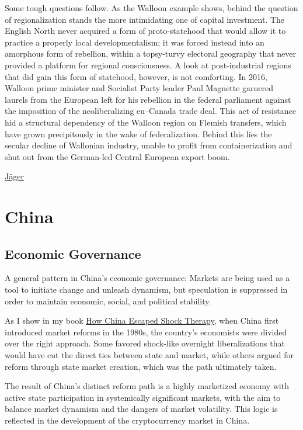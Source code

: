 \documentclass[
]{book}
\begin{document}
Some tough questions follow. As the Walloon example shows, behind the question of regionalization stands the more intimidating one of capital investment. The English North never acquired a form of proto-statehood that would allow it to practice a properly local developmentalism; it was forced instead into an amorphous form of rebellion, within a topsy-turvy electoral geography that never provided a platform for regional consciousness. A look at post-industrial regions that did gain this form of statehood, however, is not comforting. In 2016, Walloon prime minister and Socialist Party leader Paul Magnette garnered laurels from the European left for his rebellion in the federal parliament against the imposition of the neoliberalizing eu--Canada trade deal. This act of resistance hid a structural dependency of the Walloon region on Flemish transfers, which have grown precipitously in the wake of federalization. Behind this lies the secular decline of Wallonian industry, unable to profit from containerization and shut out from the German-led Central European export boom.

\href{https://newleftreview.org/issues/ii128/articles/anton-jager-rebel-regions}{Jäger}

\hypertarget{china}{%
\chapter{China}\label{china}}

\hypertarget{economic-governance}{%
\section{Economic Governance}\label{economic-governance}}

A general pattern in China's economic governance: Markets are being used as a tool to initiate change and unleash dynamism, but speculation is suppressed in order to maintain economic, social, and political stability.

As I show in my book \href{https://www.isabellaweber.com/book}{How China Escaped Shock Therapy}, when China first introduced market reforms in the 1980s, the country's economists were divided over the right approach. Some favored shock-like overnight liberalizations that would have cut the direct ties between state and market, while others argued for reform through state market creation, which was the path ultimately taken.

The result of China's distinct reform path is a highly marketized economy with active state participation in systemically significant markets, with the aim to balance market dynamism and the dangers of market volatility. This logic is reflected in the development of the cryptocurrency market in China.
\end{document}

